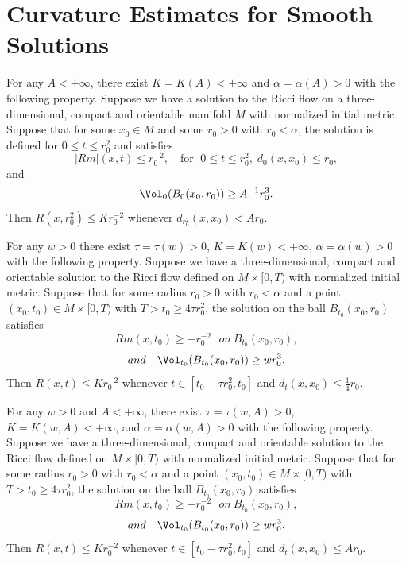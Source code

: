 \section{Curvature Estimates for Smooth Solutions}
\begin{theorem}
  \label{thm:cz-almost-euclidean-volume-curvature-control}

For any $A<+\infty$, there exist $K=K(A)<+\infty$ and
$\alpha=\alpha(A)>0$ with the following property. Suppose we have
a solution to the Ricci flow on a three-dimensional, compact and
orientable manifold $M$ with normalized initial metric. Suppose
that for some $x_0\in M$ and some $r_0>0$ with $r_0<\alpha$, the
solution is defined for $0\le t\le r_0^2$ and satisfies
$$
|Rm|(x,t)\le r_0^{-2},\quad \text{for }\; 0\le t\le
r_0^2,\;d_0(x,x_0)\le r_0,
$$
and
$$
\Vol_0(B_0(x_0,r_0))\ge A^{-1}r_0^3.
$$
Then $R(x,r_0^2)\le Kr_0^{-2}$ whenever $d_{r_0^2}(x,x_0)<Ar_0$.
\end{theorem}
\begin{theorem}
  \label{thm:cz-lower-volume-ratio-curvature-control}

For any $w>0$ there exist $\tau=\tau(w)>0$, $K=K(w)<+\infty$,
$\alpha=\alpha(w)>0$ with the following property. Suppose we have
a three-dimensional, compact and orientable solution to the Ricci
flow defined on $M\times[0,T)$ with normalized initial metric.
Suppose that for some radius $r_0>0$ with $r_0<\alpha$ and a point
$(x_0,t_0)\in M\times[0,T)$ with $T
> t_0\geq4\tau r^2_0$, the solution on the ball $B_{t_0}(x_0,r_0)$
satisfies
$$
Rm(x,t_0)\geq-r_0^{-2}\ \ \ on\ B_{t_0}(x_0,r_0),
$$
$$
and\ \ \ \Vol_{t_0}(B_{t_0}(x_0,r_0))\geq wr_0^3.
$$
Then $R(x,t)\leq Kr_0^{-2}$ whenever $t\in[t_0-\tau r^2_0,t_0]$
and $d_t(x,x_0)\leq\frac{1}{4}r_0.$
\end{theorem}
\begin{corollary}
  \label{cor:cz-localized-volume-sectional-curvature-control}

For any $w>0$ and $A<+\infty$, there exist $\tau=\tau(w,A)>0$,
$K=K(w,A)<+\infty$, and $\alpha=\alpha(w,A)>0$ with the following
property. Suppose we have a three-dimensional, compact and
orientable solution to the Ricci flow defined on $M\times[0,T)$
with normalized initial metric. Suppose that for some radius
$r_0>0$ with $r_0 <\alpha$ and a point $(x_0,t_0)\in M\times[0,T)$
with $T > t_0\geq 4\tau r^2_0$, the solution on the ball
$B_{t_0}(x_0,r_0)$ satisfies
$$
Rm(x,t_0)\geq-r_0^{-2}\ \ \ on\ B_{t_0}(x_0,r_0),
$$
$$
and\ \ \ \Vol_{t_0}(B_{t_0}(x_0,r_0))\geq wr_0^3.
$$
Then $R(x,t)\leq Kr_0^{-2}$ whenever $t\in[t_0-\tau r^2_0,t_0]$
and $d_t(x,x_0)\leq Ar_0.$
\end{corollary}
